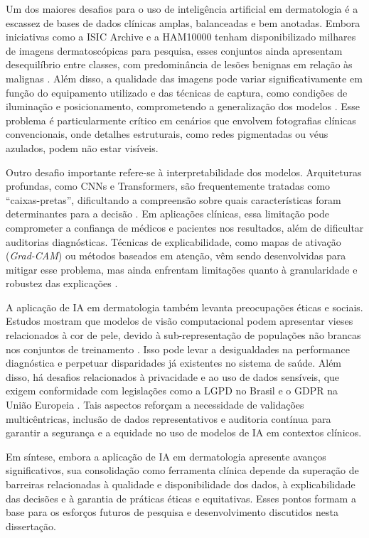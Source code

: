 Um dos maiores desafios para o uso de inteligência artificial em dermatologia é a escassez de bases de dados clínicas amplas, balanceadas e bem anotadas. Embora iniciativas como a ISIC Archive e a HAM10000 tenham disponibilizado milhares de imagens dermatoscópicas para pesquisa, esses conjuntos ainda apresentam desequilíbrio entre classes, com predominância de lesões benignas em relação às malignas \cite{tschandl2018ham10000,codella2019skin}. Além disso, a qualidade das imagens pode variar significativamente em função do equipamento utilizado e das técnicas de captura, como condições de iluminação e posicionamento, comprometendo a generalização dos modelos \cite{navarretedechent2018automated}. Esse problema é particularmente crítico em cenários que envolvem fotografias clínicas convencionais, onde detalhes estruturais, como redes pigmentadas ou véus azulados, podem não estar visíveis.

Outro desafio importante refere-se à interpretabilidade dos modelos. Arquiteturas profundas, como CNNs e Transformers, são frequentemente tratadas como “caixas-pretas”, dificultando a compreensão sobre quais características foram determinantes para a decisão \cite{holzinger2017we}. Em aplicações clínicas, essa limitação pode comprometer a confiança de médicos e pacientes nos resultados, além de dificultar auditorias diagnósticas. Técnicas de explicabilidade, como mapas de ativação (\textit{Grad-CAM}) ou métodos baseados em atenção, vêm sendo desenvolvidas para mitigar esse problema, mas ainda enfrentam limitações quanto à granularidade e robustez das explicações \cite{selvaraju2017gradcam}.

A aplicação de IA em dermatologia também levanta preocupações éticas e sociais. Estudos mostram que modelos de visão computacional podem apresentar vieses relacionados à cor de pele, devido à sub-representação de populações não brancas nos conjuntos de treinamento \cite{daneshjou2022disparities}. Isso pode levar a desigualdades na performance diagnóstica e perpetuar disparidades já existentes no sistema de saúde. Além disso, há desafios relacionados à privacidade e ao uso de dados sensíveis, que exigem conformidade com legislações como a LGPD no Brasil e o GDPR na União Europeia \cite{pantanowitz2024regulatory}. Tais aspectos reforçam a necessidade de validações multicêntricas, inclusão de dados representativos e auditoria contínua para garantir a segurança e a equidade no uso de modelos de IA em contextos clínicos.

Em síntese, embora a aplicação de IA em dermatologia apresente avanços significativos, sua consolidação como ferramenta clínica depende da superação de barreiras relacionadas à qualidade e disponibilidade dos dados, à explicabilidade das decisões e à garantia de práticas éticas e equitativas. Esses pontos formam a base para os esforços futuros de pesquisa e desenvolvimento discutidos nesta dissertação.





